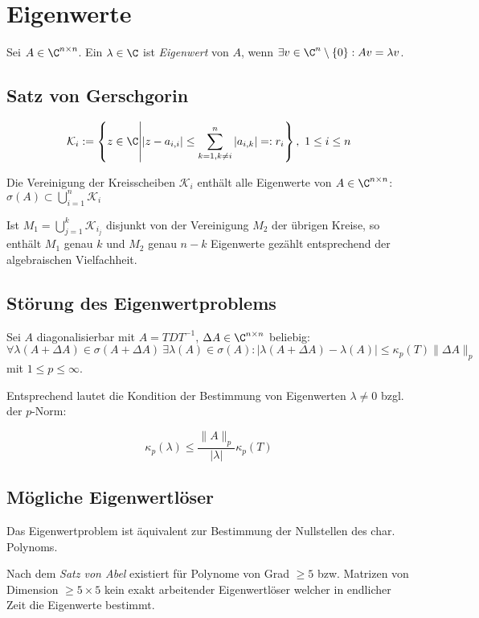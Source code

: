 \section*{Eigenwerte}

Sei $A \in \C^{n \times n}$. Ein $\lambda \in \C$ ist \emph{Eigenwert} von $A$, wenn $\exists v \in \C^n\setminus\{0\} : Av = \lambda v$.

\subsection*{Satz von Gerschgorin}

$$\mathcal{K}_i := \left\{ z \in \C \middle| |z-a_{i,i}| \leq \sum_{k=1, k\neq i}^n |a_{i,k}| =: r_i \right\}, \ 1 \leq i \leq n$$

Die Vereinigung der Kreisscheiben $\mathcal{K}_i$ enthält alle Eigenwerte von $A \in \C^{n \times n}$: $\sigma(A) \subset \bigcup_{i=1}^n \mathcal{K}_i$

\spacing

Ist $M_1 = \bigcup_{j=1}^k \mathcal{K}_{i_j}$ disjunkt von der Vereinigung $M_2$ der übrigen Kreise, so enthält $M_1$ genau $k$ und $M_2$ genau $n-k$ Eigenwerte gezählt entsprechend der algebraischen Vielfachheit.

\subsection*{Störung des Eigenwertproblems}

Sei $A$ diagonalisierbar mit $A= TDT^{-1}$, $\Delta A \in \C^{n \times n}$ beliebig: $\forall \lambda(A+\Delta A) \in \sigma(A+\Delta A) \ \exists \lambda(A) \in \sigma(A) : |\lambda(A+\Delta A) - \lambda(A)| \leq \kappa_p(T) \|\Delta A\|_p$ mit $1 \leq p \leq \infty$.

\spacing

Entsprechend lautet die Kondition der Bestimmung von Eigenwerten $\lambda \neq 0$ bzgl. der $p$-Norm:

$$\kappa_p(\lambda) \leq \frac{\|A\|_p}{|\lambda|} \kappa_p(T)$$

\subsection*{Mögliche Eigenwertlöser}

Das Eigenwertproblem ist äquivalent zur Bestimmung der Nullstellen des char. Polynoms.

Nach dem \emph{Satz von Abel} existiert für Polynome von Grad $\geq 5$ bzw. Matrizen von Dimension $\geq 5\times5$ kein exakt arbeitender Eigenwertlöser welcher in endlicher Zeit die Eigenwerte bestimmt.

